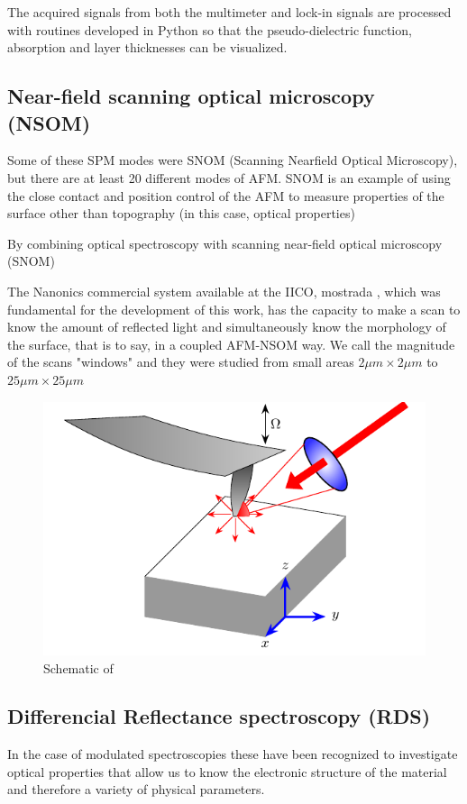 The acquired signals from both the multimeter and lock-in signals are processed with routines developed in Python so that the pseudo-dielectric function, absorption and layer thicknesses can be visualized. 

\subsection{Near-field scanning optical microscopy (NSOM)}
\vspace{-1cm}
Some of these SPM modes were SNOM (Scanning Nearfield Optical
Microscopy), but there are at least 20 different modes of AFM. SNOM is an example of
using the close contact and position control of the AFM to measure properties of the
surface other than topography (in this case, optical properties)

By combining optical spectroscopy with scanning near-ﬁeld optical microscopy
(SNOM)


The Nanonics commercial system available at the IICO, mostrada , which was fundamental for the development of this work, has the capacity to make a scan to know the amount of reflected light and simultaneously know the morphology of the surface, that is to say, in a coupled AFM-NSOM way. We call the magnitude of the scans "windows" and they were studied from small areas $2\mu m \times 2\mu m$ to  $25\mu m \times 25\mu m$


\begin{figure}[H]
	\centering
	\includegraphics[width=0.7\linewidth]{FIGURES/Characterization_techniques/NSOM-setup}
	\caption{Schematic of }
	\label{fig:NSOM:SETUP}
\end{figure}





\subsection{Differencial Reflectance spectroscopy (RDS)}
\vspace{-1cm}
In the case of modulated spectroscopies these have been recognized to investigate optical properties that allow us to know the electronic structure of the material and therefore a variety of physical parameters. 

